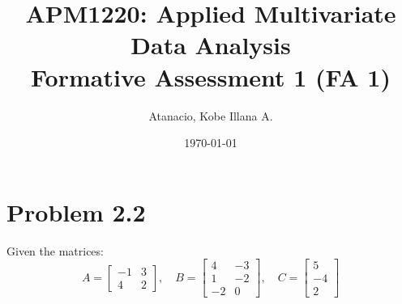 \documentclass[11pt,letterpaper]{article}
\title{APM1220: Applied Multivariate Data Analysis \\ Formative Assessment 1 (FA 1)}
\author{Atanacio, Kobe Illana A.}
\date{\today}
\begin{document}
\maketitle

\section*{Problem 2.2}
Given the matrices:
$$A = \begin{bmatrix} -1 & 3 \\ 4 & 2 \end{bmatrix}, \quad B = \begin{bmatrix} 4 & -3 \\ 1 & -2 \\ -2 & 0 \end{bmatrix}, \quad C = \begin{bmatrix} 5 \\ -4 \\ 2 \end{bmatrix}$$
\end{document}
